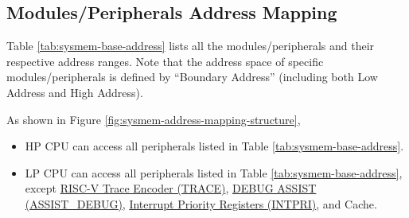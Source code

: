 \documentclass[main\_\_EN.tex]{subfiles}
\begin{document}
\subsection{Modules/Peripherals Address Mapping}
\label{para:sysmem-mod-peri-add-mapping}

Table \ref{tab:sysmem-base-address} lists all the modules/peripherals and their respective address ranges.
Note that the address space of specific modules/peripherals is defined by “Boundary Address” (including both Low Address and High Address).

\begin{tiplisting}
As shown in Figure \ref{fig:sysmem-address-mapping-structure},
\vspace{-1em}
\begin{itemize}
    \item HP CPU can access all peripherals listed in Table \ref{tab:sysmem-base-address}.
    \item LP CPU can access all peripherals listed in Table \ref{tab:sysmem-base-address}, except \hyperref[mod:riscvtracenc]{RISC-V Trace Encoder (TRACE)}, \hyperref[mod:dbgassist]{DEBUG ASSIST (ASSIST\_DEBUG)}, \hyperref[mod:riscvcpu]{Interrupt Priority Registers (INTPRI)}, and Cache.
\end{itemize}
\end{tiplisting}
\end{document}

